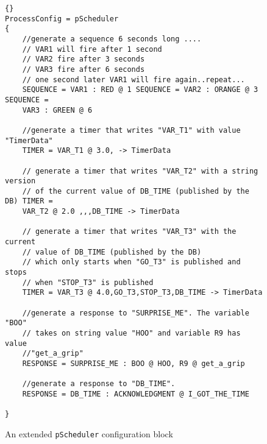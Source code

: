 \documentclass[a4paper,10pt]{article}
\newcommand{\Code}[1]{\texttt{#1} }
\newcommand{\code}[1]{\Code{#1} }
\begin{document}
\begin{figure}

\begin{lstlisting}[]{}
ProcessConfig = pScheduler
{
    //generate a sequence 6 seconds long ....
    // VAR1 will fire after 1 second
    // VAR2 fire after 3 seconds
    // VAR3 fire after 6 seconds
    // one second later VAR1 will fire again..repeat...
    SEQUENCE = VAR1 : RED @ 1 SEQUENCE = VAR2 : ORANGE @ 3 SEQUENCE =
    VAR3 : GREEN @ 6

    //generate a timer that writes "VAR_T1" with value "TimerData"
    TIMER = VAR_T1 @ 3.0, -> TimerData

    // generate a timer that writes "VAR_T2" with a string version
    // of the current value of DB_TIME (published by the DB) TIMER =
    VAR_T2 @ 2.0 ,,,DB_TIME -> TimerData

    // generate a timer that writes "VAR_T3" with the current
    // value of DB_TIME (published by the DB)
    // which only starts when "GO_T3" is published and stops
    // when "STOP_T3" is published
    TIMER = VAR_T3 @ 4.0,GO_T3,STOP_T3,DB_TIME -> TimerData

    //generate a response to "SURPRISE_ME". The variable "BOO"
    // takes on string value "HOO" and variable R9 has value
    //"get_a_grip"
    RESPONSE = SURPRISE_ME : BOO @ HOO, R9 @ get_a_grip

    //generate a response to "DB_TIME".
    RESPONSE = DB_TIME : ACKNOWLEDGMENT @ I_GOT_THE_TIME

}
\end{lstlisting}\caption{An extended \code{pScheduler} configuration block}
\label{Fig:SchedulerExt}
\end{figure}
\end{document}
